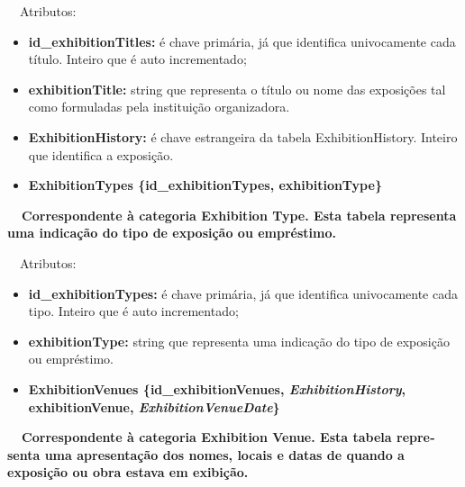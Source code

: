 \documentclass[letterpaper]{article}
\newcommand\textstyleStrongEmphasis[1]{\textbf{#1}}
\newcommand\liststyleLi{%
\renewcommand\labelitemi{{\textbullet}}
\renewcommand\labelitemii{[27A2?]}
\renewcommand\labelitemiii{{\textbullet}}
\renewcommand\labelitemiv{{\textbullet}}
}
\newcommand\liststyleLxiv{%
\renewcommand\labelitemi{[27A2?]}
\renewcommand\labelitemii{[27A2?]}
\renewcommand\labelitemiii{[27A2?]}
\renewcommand\labelitemiv{[27A2?]}
}
\begin{document}
\bigskip

{
\ \ Atributos:}

\liststyleLxiv
\begin{itemize}
\item {
\textbf{id\_exhibitionTitles: }\'e chave prim\'aria, j\'a que identifica
univocamente cada t\'itulo. Inteiro que \'e auto incrementado;}
\item {
\textbf{exhibitionTitle: }string que representa o t\'itulo ou nome das
exposi\c{c}\~oes tal como formuladas pela institui\c{c}\~ao
organizadora.}
\item {
\textbf{ExhibitionHistory:}\textit{ }\'e chave estrangeira da tabela
ExhibitionHistory. Inteiro que identifica a exposi\c{c}\~ao.}
\end{itemize}

\bigskip

\liststyleLi
\begin{itemize}
\item {\bfseries
ExhibitionTypes\textmd{ \{}\textmd{id\_exhibitionTypes}\textmd{,
exhibitionType\}}}
\end{itemize}
{\bfseries
\foreignlanguage{english}{\textmd{\ \ Correspondente \`a categoria
}}\foreignlanguage{english}{Exhibition}\textstyleStrongEmphasis{\foreignlanguage{english}{
Type}}\foreignlanguage{english}{\textmd{. Esta
}}\textstyleStrongEmphasis{\foreignlanguage{english}{\textmd{tabela}}}\foreignlanguage{english}{\textmd{
representa uma indica\c{c}\~ao do tipo de exposi\c{c}\~ao ou
empr\'estimo.}}}


\bigskip

{
\ \ Atributos:}

\liststyleLxiv
\begin{itemize}
\item {
\textbf{id\_exhibitionTypes: }\'e chave prim\'aria, j\'a que identifica
univocamente cada tipo. Inteiro que \'e auto incrementado;}
\item {
\textbf{exhibitionType: }string que representa uma indica\c{c}\~ao do
tipo de exposi\c{c}\~ao ou empr\'estimo.}
\end{itemize}

\bigskip

\liststyleLi
\begin{itemize}
\item {\bfseries
ExhibitionVenues\textmd{ \{}\textmd{id\_exhibitionVenues}\textmd{,
}\textmd{\textit{ExhibitionHistory}}\textmd{, exhibitionVenue,
}\textmd{\textit{ExhibitionVenueDate}}\textmd{\}}}
\end{itemize}
{\bfseries
\foreignlanguage{english}{\textmd{\ \ Correspondente \`a categoria
}}\foreignlanguage{english}{Exhibition}\textstyleStrongEmphasis{\foreignlanguage{english}{
Venue}}\foreignlanguage{english}{\textmd{. Esta
}}\textstyleStrongEmphasis{\foreignlanguage{english}{\textmd{tabela}}}\foreignlanguage{english}{\textmd{
representa uma apresenta\c{c}\~ao dos nomes, locais e datas de quando a
exposi\c{c}\~ao ou obra estava em exibi\c{c}\~ao.}}}
\end{document}
